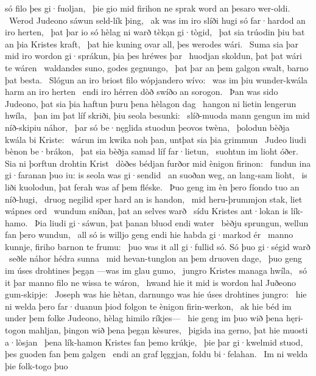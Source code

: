só filo þes gi·fuoljan, \hld\ þie gio mid firihon ne sprak
word an þesaro wer-oldi. \hld\ Werod Judeono
sáwun seld-lík þing, \hld\ ak was im iro slíði hugi
só far·hardod an iro herten, \hld\ þat þar io só hèlag ni warð
tèkạn gi·tògid, \hld\ þat sia trúodin þiu bat
an þia Kristes kraft, \hld\ þat hie kuning ovar all,
þes werodes wári. \hld\ Suma sia þar mid iro wordon gi·sprákun,
þia þes hréwes þar \hld\ huodjan skoldun,
þat þat wári te wáren \hld\ waldandes suno,
godes gegnungo, \hld\ þat þar an þem galgon swalt,
barno þat besta. \hld\ Slógun an iro briost filo
wópjandero wívo: \hld\ was im þiu wunder-kwála
harm an iro herten \hld\ endi iro hérren dòð
swíðo an sorogon. \hld\ Þan was sido Judeono,
þat sia þia haftun þuru þena hèlagon dag \hld\ hangon ni lietin
lengerun hwíla, \hld\ þan im þat líf skriði,
þiu seola besunki: \hld\ slíð-muoda mann
gengun im mid níð-skipiu náhor, \hld\ þar só be·nęglida stuodun
þeovos twèna, \hld\ þolodun bèðja
kwála bi Kriste: \hld\ wárun im kwika noh þan,
untþat sia þia grimmun \hld\ Judeo liudi
bènon be·brákon, \hld\ þat sia bèðja samad
líf far·lietun, \hld\ suohtun im lioht óðer.
Sia ni þorftun drohtin Krist \hld\ dòðes bédjan
furðor mid ènigon firinon: \hld\ fundun ina gi·faranan þuo iu:
is seola was gi·sendid \hld\ an suoðan weg,
an lang-sam lioht, \hld\ is liði kuolodun,
þat ferah was af þem fléske. \hld\ Þuo geng im èn þero fíondo tuo
an níð-hugi, \hld\ druog negilid sper
hard an is handon, \hld\ mid heru-þrummjon stak,
liet wápnes ord \hld\ wundum sníðan,
þat an selves warð \hld\ sídu Kristes
ant·lokan is lík-hamo. \hld\ Þia liudi gi·sáwun,
þat þanan bluod endi water \hld\ bèðju sprungun,
wellun fan þero wundun, \hld\ all só is willjo geng
endi hie habda gi·markod ér \hld\ manno kunnje,
firiho barnon te frumu: \hld\ þuo was it all gi·fullid só.
Só þuo gi·ségid warð \hld\ seðle náhor
hédra sunna \hld\ mid hevan-tunglon
an þem druoven dage, \hld\ þuo geng im úses drohtines þegạn
—was im glau gumo, \hld\ jungro Kristes
managa hwíla, \hld\ só it þar manno filo
ne wissa te wáron, \hld\ hwand hie it mid is wordon hal
Juðeono gum-skipje: \hld\ Joseph was hie hètan,
darnungo was hie úses drohtines jungro: \hld\ hie ni welda þero far·duanun þiod
folgon te ènigon firin-werkon, \hld\ ak hie béd im under þem folke Judeono,
hèlag himilo ríkjes— \hld\ hie geng im þuo wið þena hęri-togon mahljan,
þingon wið þena þegạn kèsures, \hld\ þigida ina gerno,
þat hie muosti a·lòsjan \hld\ þena lík-hamon
Kristes fan þemo krúkje, \hld\ þie þar gi·kwelmid stuod,
þes guoden fan þem galgen \hld\ endi an graf lęggjan,
foldu bi·felahan. \hld\ Im ni welda þie folk-togo þuo
